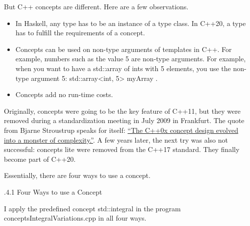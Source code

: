 But C++ concepts are different. Here are a few observations.

\begin{itemize}
\item 
In Haskell, any type has to be an instance of a type class. In C++20, a type has to fulfill the requirements of a concept.

\item 
Concepts can be used on non-type arguments of templates in C++. For example, numbers such as the value 5 are non-type arguments. For example, when you want to have a std::array of ints with 5 elements, you use the non-type argument 5: std::array<int, 5> myArray .

\item 
Concepts add no run-time costs.
\end{itemize}

Originally, concepts were going to be the key feature of C++11, but they were removed during a standardization meeting in July 2009 in Frankfurt. The quote from Bjarne Stroustrup speaks for itself: \href{https://isocpp.org/blog/2013/02/concepts-lite-constraining-templates-with-predicates-andrew-sutton-bjarne-s}{“The C++0x concept design evolved into a monster of complexity.”}. A few years later, the next try was also not successful: concepts lite were removed from the C++17 standard. They finally become part of C++20.


Essentially, there are four ways to use a concept.

.4.1\hspace{0.2cm} Four Ways to use a Concept

I apply the predefined concept std::integral in the program conceptsIntegralVariations.cpp in all four ways.

